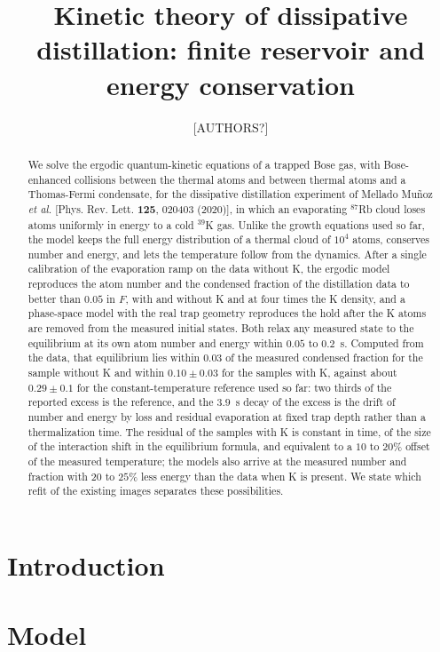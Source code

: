 \documentclass[aps,prl,twocolumn,superscriptaddress,floatfix]{revtex4-2}
\begin{document}
\title{Kinetic theory of dissipative distillation: finite reservoir and energy conservation}
\author{[AUTHORS?]}
\affiliation{[AFFILIATION?]}

\begin{abstract}
We solve the ergodic quantum-kinetic equations of a trapped Bose gas, with
Bose-enhanced collisions between the thermal atoms and between thermal atoms
and a Thomas-Fermi condensate, for the dissipative distillation experiment of
Mellado Mu\~noz \emph{et al.} [Phys. Rev. Lett. \textbf{125}, 020403 (2020)],
in which an evaporating $^{87}$Rb cloud loses atoms uniformly in energy to a
cold $^{39}$K gas. Unlike the growth equations used so far, the model keeps
the full energy distribution of a thermal cloud of $10^4$ atoms, conserves
number and energy, and lets the temperature follow from the dynamics. After a
single calibration of the evaporation ramp on the data without K, the
ergodic model reproduces the atom number and the condensed fraction of the
distillation data to better than $0.05$ in $F$, with and without K and at
four times the K density, and a phase-space model with the real trap
geometry reproduces the hold after the K atoms are removed from the
measured initial states. Both relax any measured state to the equilibrium
at its own atom number and energy within $0.05$ to $0.2$~s. Computed from
the data, that equilibrium lies within $0.03$ of the measured condensed
fraction for the sample without K and within $0.10\pm0.03$ for the samples
with K, against about $0.29\pm0.1$ for the constant-temperature reference used
so far: two thirds of the reported excess is the reference, and the $3.9$~s
decay of the excess is the drift of number and energy by loss and residual
evaporation at fixed trap depth rather than a thermalization time. The
residual of the samples with K is constant in time, of the size of the
interaction shift in the equilibrium formula, and equivalent to a $10$ to
$20\%$ offset of the measured temperature; the models also arrive at the
measured number and fraction with $20$ to $25\%$ less energy than the data
when K is present. We state which refit of the existing images separates
these possibilities.
\end{abstract}
\maketitle

\section{Introduction}


\section{Model}
\label{sec:model}








\end{document}
